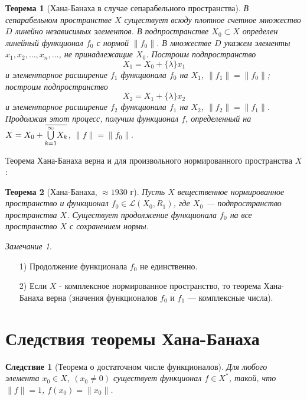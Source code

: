 \documentclass[12pt,a4paper,titlepage,oneside]{book}
\newcommand{\overbar}[1]{\mkern 1.5mu\overline{\mkern-1.5mu#1\mkern-1.5mu}\mkern 1.5mu}
\theoremstyle{definition}
\theoremstyle{plain}
\newtheorem*{theorem}{Теорема}
\theoremstyle{remark}
\newtheorem*{remark}{Замечание}
\theoremstyle{remark}
\theoremstyle{remark}
\theoremstyle{remark}
\theoremstyle{plain}
\theoremstyle{plain}
\newtheorem*{corollary}{Следствие}
\begin{document}
\begin{theorem}[Хана-Банаха в случае сепарабельного пространства]
В сепарабельном пространстве $X$ существует всюду плотное счетное множество $D$ линейно независимых элементов.
В подпространстве $X_0 \subset X$ определен линейный функционал $f_0$ с нормой $\lVert f_0 \rVert$. В множестве $D$ укажем элементы $x_1, x_2, \ldots, x_n,\ldots$, не принадлежащие $X_0$. Построим подпространство
$$X_1=X_0+\{ \lambda\}x_1 $$
и элементарное расширение $f_1$ функционала $f_0$ на $X_1$, $\lVert f_1 \rVert= \lVert f_0 \rVert$;\\
построим подпространство
$$X_2=X_1+\{ \lambda\}x_2 $$
и элементарное расширение $f_2$ функционала $f_1$ на $X_2$, $\lVert f_2 \rVert= \lVert f_1 \rVert$.\\
Продолжая этот процесс, получим функционал $f$, определенный на $X=X_0+\overbar{\overset{\infty}{\underset{k=1}{\bigcup}}X_k}$, $\lVert f \rVert= \lVert f_0 \rVert.$
\end{theorem}
Теорема Хана-Банаха верна и для произвольного нормированного пространства $X$: 
\begin{theorem}[Хана-Банаха, $\approx 1930$ г]
Пусть $X$ вещественное нормированное пространство и функционал $f_0 \in \mathcal{L}(X_0, R_1)$, где $X_0$ --- подпространство пространства $X$. Существует продолжение функционала $f_0$ на все пространство $X$ с сохранением нормы. 
\end{theorem}
\begin{remark}
\hfill \break
\vspace{-1.5em}
\begin{enumerate}
\item[1)] Продолжение функционала $f_0$ не единственно.
\item[2)] Если $X$ - комплексное нормированное пространство, то теорема Хана-Банаха верна (значения функционалов $f_0$ и $f_1$ --- комплексные числа).
\end{enumerate}
\end{remark}

\section{Следствия теоремы Хана-Банаха}

\begin{corollary}[Теорема о достаточном числе функционалов]
Для любого элемента $x_0 \in X$, $(x_0 \ne0)$ существует функционал $f \in X^*$, такой, что $\lVert f \rVert=1$, $f(x_0)=\lVert x_0\rVert$.
\end{corollary}
\end{document}
